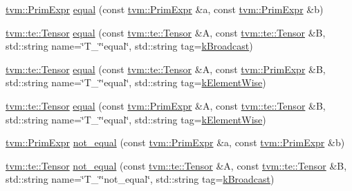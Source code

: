 \begin{DoxyCompactItemize}
\item 
\hyperlink{classtvm_1_1PrimExpr}{tvm\+::\+Prim\+Expr} \hyperlink{namespacetopi_ae10e1fb8c765a9ae15c12f45199375b3}{equal} (const \hyperlink{classtvm_1_1PrimExpr}{tvm\+::\+Prim\+Expr} \&a, const \hyperlink{classtvm_1_1PrimExpr}{tvm\+::\+Prim\+Expr} \&b)
\item 
\hyperlink{classtvm_1_1te_1_1Tensor}{tvm\+::te\+::\+Tensor} \hyperlink{namespacetopi_a74898d56b1d5ef2c07812764242d6271}{equal} (const \hyperlink{classtvm_1_1te_1_1Tensor}{tvm\+::te\+::\+Tensor} \&A, const \hyperlink{classtvm_1_1te_1_1Tensor}{tvm\+::te\+::\+Tensor} \&B, std\+::string name=\char`\"{}T\+\_\+\char`\"{}\char`\"{}equal\char`\"{}, std\+::string tag=\hyperlink{namespacetopi_a794b9155e9ba9d1c9c42a1cff1fb645f}{k\+Broadcast})
\item 
\hyperlink{classtvm_1_1te_1_1Tensor}{tvm\+::te\+::\+Tensor} \hyperlink{namespacetopi_afde3cae32ad2ca96b5bd0b32d9706280}{equal} (const \hyperlink{classtvm_1_1te_1_1Tensor}{tvm\+::te\+::\+Tensor} \&A, const \hyperlink{classtvm_1_1PrimExpr}{tvm\+::\+Prim\+Expr} \&B, std\+::string name=\char`\"{}T\+\_\+\char`\"{}\char`\"{}equal\char`\"{}, std\+::string tag=\hyperlink{namespacetopi_ac1b34ed59d38a5f5338bee6b2cad42be}{k\+Element\+Wise})
\item 
\hyperlink{classtvm_1_1te_1_1Tensor}{tvm\+::te\+::\+Tensor} \hyperlink{namespacetopi_ae2d6d5ecbff7ee50dfa45a81e3b691c4}{equal} (const \hyperlink{classtvm_1_1PrimExpr}{tvm\+::\+Prim\+Expr} \&A, const \hyperlink{classtvm_1_1te_1_1Tensor}{tvm\+::te\+::\+Tensor} \&B, std\+::string name=\char`\"{}T\+\_\+\char`\"{}\char`\"{}equal\char`\"{}, std\+::string tag=\hyperlink{namespacetopi_ac1b34ed59d38a5f5338bee6b2cad42be}{k\+Element\+Wise})
\item 
\hyperlink{classtvm_1_1PrimExpr}{tvm\+::\+Prim\+Expr} \hyperlink{namespacetopi_a19da66c62c01b4c51d8db2e35b075b09}{not\+\_\+equal} (const \hyperlink{classtvm_1_1PrimExpr}{tvm\+::\+Prim\+Expr} \&a, const \hyperlink{classtvm_1_1PrimExpr}{tvm\+::\+Prim\+Expr} \&b)
\item 
\hyperlink{classtvm_1_1te_1_1Tensor}{tvm\+::te\+::\+Tensor} \hyperlink{namespacetopi_a4e3a9e0cc46debf8668f8d58fe4b395f}{not\+\_\+equal} (const \hyperlink{classtvm_1_1te_1_1Tensor}{tvm\+::te\+::\+Tensor} \&A, const \hyperlink{classtvm_1_1te_1_1Tensor}{tvm\+::te\+::\+Tensor} \&B, std\+::string name=\char`\"{}T\+\_\+\char`\"{}\char`\"{}not\+\_\+equal\char`\"{}, std\+::string tag=\hyperlink{namespacetopi_a794b9155e9ba9d1c9c42a1cff1fb645f}{k\+Broadcast})
\item 

\end{DoxyCompactItemize}
